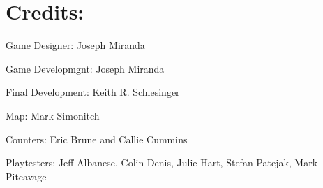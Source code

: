 \section{Credits:}
Game Designer: Joseph Miranda

Game Developmgnt: Joseph Miranda

Final Development: Keith R. Schlesinger

Map: Mark Simonitch

Counters: Eric Brune and Callie Cummins

Playtesters: Jeff Albanese, Colin Denis, Julie Hart, Stefan Patejak, Mark Pitcavage
